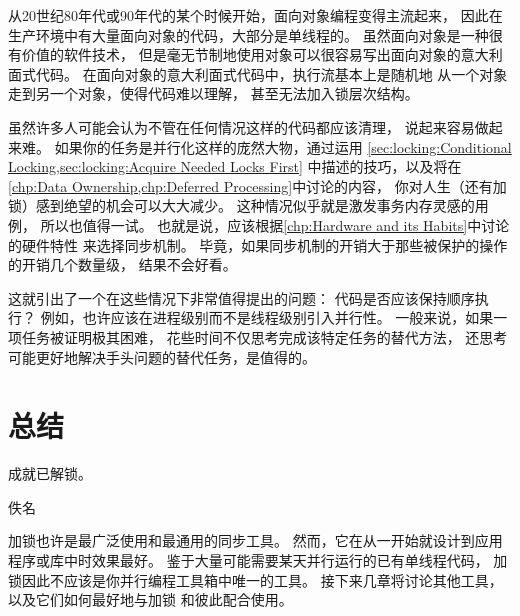 从20世纪80年代或90年代的某个时候开始，面向对象编程变得主流起来，
因此在生产环境中有大量面向对象的代码，大部分是单线程的。
虽然面向对象是一种很有价值的软件技术，
但是毫无节制地使用对象可以很容易写出面向对象的意大利面式代码。
在面向对象的意大利面式代码中，执行流基本上是随机地
从一个对象走到另一个对象，使得代码难以理解，
甚至无法加入锁层次结构。

虽然许多人可能会认为不管在任何情况这样的代码都应该清理，
说起来容易做起来难。
如果你的任务是并行化这样的庞然大物，通过运用
\cref{sec:locking:Conditional Locking,sec:locking:Acquire Needed Locks First}
中描述的技巧，以及将在
\cref{chp:Data Ownership,chp:Deferred Processing}中讨论的内容，
你对人生（还有加锁）感到绝望的机会可以大大减少。
这种情况似乎就是激发事务内存灵感的用例，
所以也值得一试。
也就是说，应该根据\cref{chp:Hardware and its Habits}中讨论的硬件特性
来选择同步机制。
毕竟，如果同步机制的开销大于那些被保护的操作的开销几个数量级，
结果不会好看。

这就引出了一个在这些情况下非常值得提出的问题：
代码是否应该保持顺序执行？
例如，也许应该在进程级别而不是线程级别引入并行性。
一般来说，如果一项任务被证明极其困难，
花些时间不仅思考完成该特定任务的替代方法，
还思考可能更好地解决手头问题的替代任务，是值得的。

\section{总结}
\label{sec:locking:Summary}
%
\epigraph{成就已解锁。}{佚名}

加锁也许是最广泛使用和最通用的同步工具。
然而，它在从一开始就设计到应用程序或库中时效果最好。
鉴于大量可能需要某天并行运行的已有单线程代码，
加锁因此不应该是你并行编程工具箱中唯一的工具。
接下来几章将讨论其他工具，以及它们如何最好地与加锁
和彼此配合使用。

